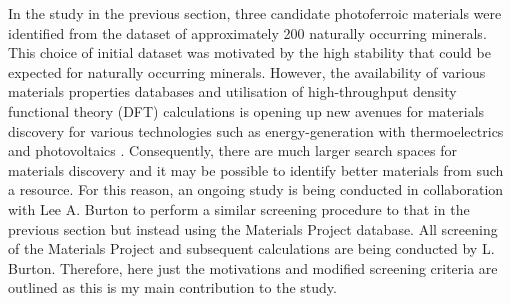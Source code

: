 \documentclass[11pt, twoside]{report}
\begin{document}


In the study in the previous section, three candidate photoferroic materials were identified from the dataset of approximately 200 naturally occurring minerals. This choice of initial dataset was motivated by the high stability that could be expected for naturally occurring minerals. However, the availability of various materials properties databases \cite{materials_project, aflowlib, NREL_data, TE_database, cmr, NOMAD} and utilisation of high-throughput density functional theory (DFT) calculations \cite{MP_highthroughput, HT_therm_cond, HT_properties} is opening up new avenues for materials discovery for various technologies \cite{roadmap} such as energy-generation with thermoelectrics \cite{thermoelectrics_rev, HT_thermoelectrics_1, HT_thermoelectrics_2} and photovoltaics \cite{SLME_screening, HT_PV, perovskite_screening_1, perovskite_screening_2, OPV_screening}.
Consequently, there are much larger search spaces for materials discovery and it may be possible to identify better materials from such a resource. 
For this reason, an ongoing study is being conducted in collaboration with Lee A. Burton to perform a similar screening procedure to that in the previous section but instead using the Materials Project \cite{materials_project} database. All screening of the Materials Project and subsequent calculations are being conducted by L. Burton. Therefore, here just the motivations and modified screening criteria are outlined as this is my main contribution to the study.
\end{document}
